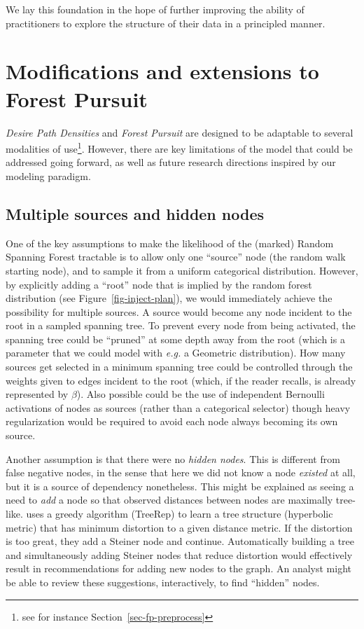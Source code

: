 \documentclass[%
	12pt,
		oneside,
		letterpaper
]{book}
\begin{document}
We lay this foundation in the hope of further improving the ability of
practitioners to explore the structure of their data in a principled
manner.

\section{Modifications and extensions to Forest
Pursuit}\label{sec-future-fp}

\emph{Desire Path Densities} and \emph{Forest Pursuit} are designed to
be adaptable to several modalities of use\footnote{see for instance
  Section~\ref{sec-fp-preprocess}}. However, there are key limitations
of the model that could be addressed going forward, as well as future
research directions inspired by our modeling paradigm.

\subsection{Multiple sources and hidden
nodes}\label{multiple-sources-and-hidden-nodes}

One of the key assumptions to make the likelihood of the (marked) Random
Spanning Forest tractable is to allow only one ``source'' node (the
random walk starting node), and to sample it from a uniform categorical
distribution. However, by explicitly adding a ``root'' node that is
implied by the random forest distribution (see
Figure~\ref{fig-inject-plan}), we would immediately achieve the
possibility for multiple sources. A source would become any node
incident to the root in a sampled spanning tree. To prevent every node
from being activated, the spanning tree could be ``pruned'' at some
depth away from the root (which is a parameter that we could model with
\emph{e.g.} a Geometric distribution). How many sources get selected in
a minimum spanning tree could be controlled through the weights given to
edges incident to the root (which, if the reader recalls, is already
represented by \(\beta\)). Also possible could be the use of independent
Bernoulli activations of nodes as sources (rather than a categorical
selector) though heavy regularization would be required to avoid each
node always becoming its own source.

Another assumption is that there were no \emph{hidden nodes}. This is
different from false negative nodes, in the sense that here we did not
know a node \emph{existed} at all, but it is a source of dependency
nonetheless. This might be explained as seeing a need to \emph{add} a
node so that observed distances between nodes are maximally tree-like.
\autocite{TreeIam_Sonthalia2020} uses a greedy algorithm (TreeRep) to
learn a tree structure (hyperbolic metric) that has minimum distortion
to a given distance metric. If the distortion is too great, they add a
Steiner node and continue. Automatically building a tree and
simultaneously adding Steiner nodes that reduce distortion would
effectively result in recommendations for adding new nodes to the graph.
An analyst might be able to review these suggestions, interactively, to
find ``hidden'' nodes.
\end{document}
